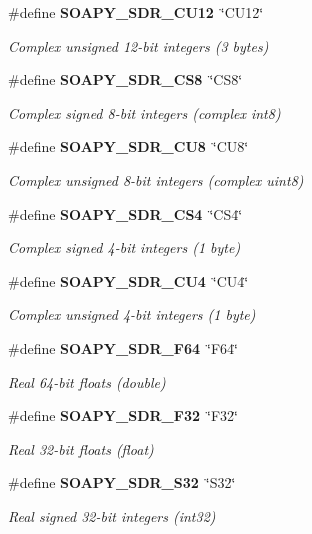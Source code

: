 \begin{DoxyCompactItemize}
\#define {\bf S\+O\+A\+P\+Y\+\_\+\+S\+D\+R\+\_\+\+C\+U12}~\char`\"{}C\+U12\char`\"{}
\begin{DoxyCompactList}\small\item\em Complex unsigned 12-\/bit integers (3 bytes) \end{DoxyCompactList}\item 
\#define {\bf S\+O\+A\+P\+Y\+\_\+\+S\+D\+R\+\_\+\+C\+S8}~\char`\"{}C\+S8\char`\"{}
\begin{DoxyCompactList}\small\item\em Complex signed 8-\/bit integers (complex int8) \end{DoxyCompactList}\item 
\#define {\bf S\+O\+A\+P\+Y\+\_\+\+S\+D\+R\+\_\+\+C\+U8}~\char`\"{}C\+U8\char`\"{}
\begin{DoxyCompactList}\small\item\em Complex unsigned 8-\/bit integers (complex uint8) \end{DoxyCompactList}\item 
\#define {\bf S\+O\+A\+P\+Y\+\_\+\+S\+D\+R\+\_\+\+C\+S4}~\char`\"{}C\+S4\char`\"{}
\begin{DoxyCompactList}\small\item\em Complex signed 4-\/bit integers (1 byte) \end{DoxyCompactList}\item 
\#define {\bf S\+O\+A\+P\+Y\+\_\+\+S\+D\+R\+\_\+\+C\+U4}~\char`\"{}C\+U4\char`\"{}
\begin{DoxyCompactList}\small\item\em Complex unsigned 4-\/bit integers (1 byte) \end{DoxyCompactList}\item 
\#define {\bf S\+O\+A\+P\+Y\+\_\+\+S\+D\+R\+\_\+\+F64}~\char`\"{}F64\char`\"{}
\begin{DoxyCompactList}\small\item\em Real 64-\/bit floats (double) \end{DoxyCompactList}\item 
\#define {\bf S\+O\+A\+P\+Y\+\_\+\+S\+D\+R\+\_\+\+F32}~\char`\"{}F32\char`\"{}
\begin{DoxyCompactList}\small\item\em Real 32-\/bit floats (float) \end{DoxyCompactList}\item 
\#define {\bf S\+O\+A\+P\+Y\+\_\+\+S\+D\+R\+\_\+\+S32}~\char`\"{}S32\char`\"{}
\begin{DoxyCompactList}\small\item\em Real signed 32-\/bit integers (int32) \end{DoxyCompactList}\item 

\end{DoxyCompactItemize}
